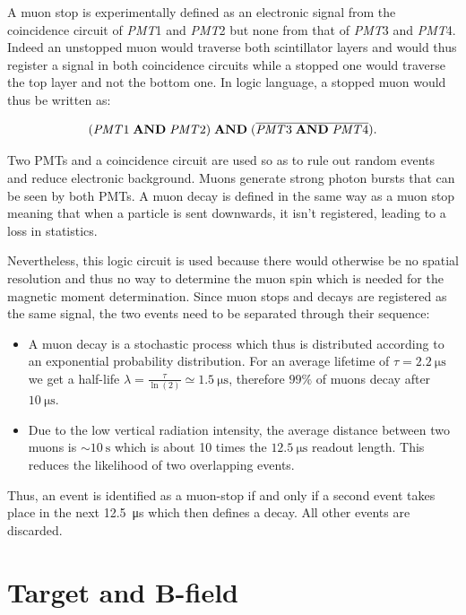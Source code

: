 A muon stop is experimentally defined as an electronic signal from the coincidence circuit of \textit{PMT}1 and \textit{PMT}2 but none from that of \textit{PMT}3 and \textit{PMT}4. Indeed an unstopped muon would traverse both scintillator layers and would thus register a signal in both coincidence circuits while a stopped one would traverse the top layer and not the bottom one. In logic language, a stopped muon would thus be written as:

\begin{equation}
(\text{\textit{PMT}1} \;\text{\textbf{AND}} \; \text{\textit{PMT}2}) \; \text{\textbf{AND}} \; (\overline{\text{\textit{PMT}3} \; \text{\textbf{AND}} \; \text{\textit{PMT}4}}).
\end{equation}

Two PMTs and a coincidence circuit are used so as to rule out random events and reduce electronic background. Muons generate strong photon bursts that can be seen by both PMTs. A muon decay is defined in the same way as a muon stop meaning that when a particle is sent downwards, it isn't registered, leading to a loss in statistics.

Nevertheless, this logic circuit is used because there would otherwise be no spatial resolution and thus no way to determine the muon spin which is needed for the magnetic moment determination. Since muon stops and decays are registered as the same signal, the two events need to be separated through their sequence:

\begin{itemize}
\item A muon decay is a stochastic process which thus is distributed according to an exponential probability distribution. For an average lifetime of $\tau=\SI{2.2}{\micro\second}$ we get a half-life $\lambda=\frac{\tau}{\ln(2)}\simeq \SI{1.5}{\micro\second}$, therefore $99\%$ of muons decay after $\SI{10}{\micro\second}$.
\item Due to the low vertical radiation intensity, the average distance between two muons is $\sim\SI{10}{\second}$ which is about 10 times the $\SI{12.5}{\micro\second}$ readout length. This reduces the likelihood of two overlapping events.
\end{itemize}

Thus, an event is identified as a muon-stop if and only if a second event takes place in the next \SI{12.5}{\micro\second} which then defines a decay. All other events are discarded.


\section{Target and B-field}

